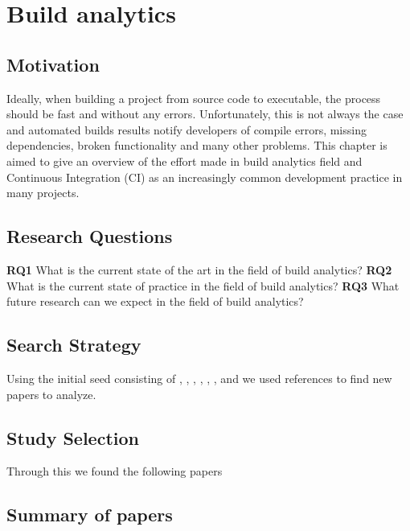 \documentclass[]{book}
\begin{document}
\chapter{Build analytics}\label{build-analytics}

\section{Motivation}\label{motivation}

Ideally, when building a project from source code to executable, the
process should be fast and without any errors. Unfortunately, this is
not always the case and automated builds results notify developers of
compile errors, missing dependencies, broken functionality and many
other problems. This chapter is aimed to give an overview of the effort
made in build analytics field and Continuous Integration (CI) as an
increasingly common development practice in many projects.

\section{Research Questions}\label{research-questions}

\textbf{RQ1} What is the current state of the art in the field of build
analytics? \textbf{RQ2} What is the current state of practice in the
field of build analytics? \textbf{RQ3} What future research can we
expect in the field of build analytics?

\section{Search Strategy}\label{search-strategy}

Using the initial seed consisting of \citet{bird2017predicting},
\citet{beller2017oops}, \citet{rausch2017empirical},
\citet{beller2017travistorrent}, \citet{pinto2018work},
\citet{zhao2017impact}, \citet{widder2018m} and \citet{hilton2016usage}
we used references to find new papers to analyze.

\section{Study Selection}\label{study-selection}

Through this we found the following papers

\section{Summary of papers}\label{summary-of-papers}
\end{document}
